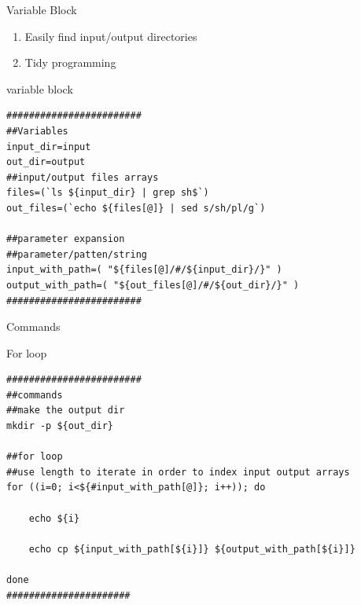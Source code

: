 \documentclass[t,10pt]{beamer}
\begin{document}
\begin{frame}[fragile,label={sec:orgheadline22}]{Variable Block}
 \begin{enumerate}
\item Easily find input/output directories
\item Tidy programming
\end{enumerate}
\begin{block}{variable block}
\lstset{language=sh,label= ,caption= ,captionpos=b,numbers=none}
\begin{lstlisting}
########################
##Variables
input_dir=input
out_dir=output
##input/output files arrays
files=(`ls ${input_dir} | grep sh$`)
out_files=(`echo ${files[@]} | sed s/sh/pl/g`)

##parameter expansion
##parameter/patten/string
input_with_path=( "${files[@]/#/${input_dir}/}" )
output_with_path=( "${out_files[@]/#/${out_dir}/}" )
########################
\end{lstlisting}
\end{block}
\end{frame}

\begin{frame}[fragile,label={sec:orgheadline23}]{Commands}
 \begin{block}{For loop}
\lstset{language=sh,label= ,caption= ,captionpos=b,numbers=none}
\begin{lstlisting}
########################
##commands
##make the output dir
mkdir -p ${out_dir}

##for loop
##use length to iterate in order to index input output arrays
for ((i=0; i<${#input_with_path[@]}; i++)); do

    echo ${i}

    echo cp ${input_with_path[${i}]} ${output_with_path[${i}]} 

done
######################
\end{lstlisting}
\end{block}
\end{frame}
\end{document}
